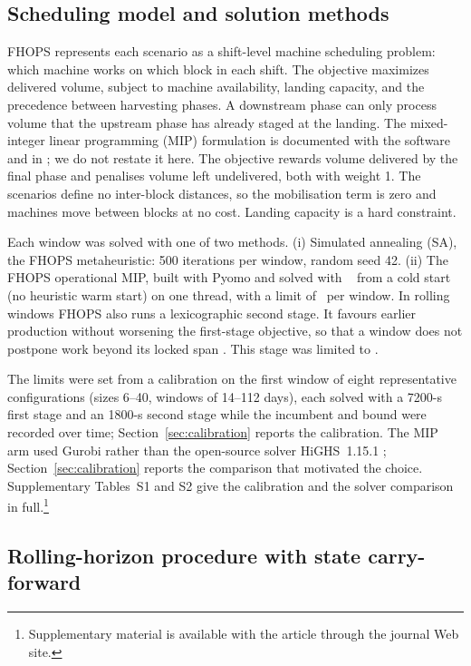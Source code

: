 \subsection{Scheduling model and solution methods}
\label{sec:solution-methods}

FHOPS represents each scenario as a shift-level machine scheduling problem: which machine works on
which block in each shift. The objective maximizes delivered volume, subject to machine
availability, landing capacity, and the precedence between harvesting phases. A downstream phase
can only process volume that the upstream phase has already staged at the landing. The
mixed-integer linear programming (MIP) formulation is documented with the software
\citep{fhops2026formulation} and in \citet{paradis2026fhops}; we do not restate it here. The objective rewards
volume delivered by the final phase and penalises volume left undelivered, both with weight 1. The
scenarios define no inter-block distances, so the mobilisation term is zero and machines move
between blocks at no cost. Landing capacity is a hard constraint.

Each window was solved with one of two methods. (i) Simulated annealing (SA), the FHOPS
metaheuristic: 500 iterations per window, random seed 42. (ii) The FHOPS operational MIP, built
with Pyomo \citep{bynum2021pyomo} and solved with \mipbackend\ \citep{gurobi2026manual} from a cold start (no heuristic warm start) on one thread, with a limit of
\miptimelimit\ per window. In rolling windows FHOPS also runs a lexicographic second stage. It
favours earlier production without worsening the first-stage objective, so that a window does not
postpone work beyond its locked span \citep{fhops2026v101}. This stage was limited to
\earlinesslimit.

The limits were set from a calibration on the first window of eight representative configurations
(sizes 6--40, windows of 14--112 days), each solved with a 7200-s first stage and an 1800-s second
stage while the incumbent and bound were recorded over time; Section~\ref{sec:calibration} reports
the calibration. The MIP arm used Gurobi rather than the open-source solver HiGHS~1.15.1
\citep{huangfu2018highs}; Section~\ref{sec:calibration} reports the comparison
that motivated the choice. Supplementary Tables~S1 and S2 give the calibration and the solver
comparison in full.\footnote{Supplementary material is available with the article through the
journal Web site.}

\subsection{Rolling-horizon procedure with state carry-forward}

